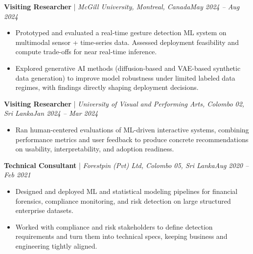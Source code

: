 \documentclass[11pt]{article}
\newenvironment{cvrole}[5]{%
  \par\noindent\textbf{\large #1} | \textit{\small #2, #3}\hfill \textit{\small #4 -- #5}\par
  \begin{itemize}[leftmargin=2em, itemsep=-0.3em, topsep=-0.5em]%
}{%
  \end{itemize}\par\noindent\mbox{}\par\vspace{0.1em}%
}
\begin{document}
\newpage
\begin{cvrole}{Visiting Researcher}{McGill University}{Montreal, Canada}{May 2024}{Aug 2024}
    \item Prototyped and evaluated a real-time gesture detection ML system on multimodal sensor + time-series data. Assessed deployment feasibility and compute trade-offs for near real-time inference.
    \item Explored generative AI methods (diffusion-based and VAE-based synthetic data generation) to improve model robustness under limited labeled data regimes, with findings directly shaping deployment decisions.
\end{cvrole}

\begin{cvrole}{Visiting Researcher}{University of Visual and Performing Arts}{Colombo 02, Sri Lanka}{Jan 2024}{Mar 2024}
    \item Ran human-centered evaluations of ML-driven interactive systems, combining performance metrics and user feedback to produce concrete recommendations on usability, interpretability, and adoption readiness.
\end{cvrole}

\begin{cvrole}{Technical Consultant}{Forestpin (Pvt) Ltd}{Colombo 05, Sri Lanka}{Aug 2020}{Feb 2021}
    \item Designed and deployed ML and statistical modeling pipelines for financial forensics, compliance monitoring, and risk detection on large structured enterprise datasets.
    \item Worked with compliance and risk stakeholders to define detection requirements and turn them into technical specs, keeping business and engineering tightly aligned.
\end{cvrole}
\end{document}
